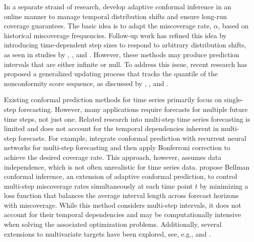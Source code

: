 \documentclass[
  11pt,
  a4paper,
]{article}
\theoremstyle{plain}
\theoremstyle{remark}
\begin{document}
In a separate strand of research, \textcite{gibbs2021} develop adaptive
conformal inference in an online manner to manage temporal distribution
shifts and ensure long-run coverage guarantees. The basic idea is to
adapt the miscoverage rate, \(\alpha\), based on historical miscoverage
frequencies. Follow-up work has refined this idea by introducing
time-dependent step sizes to respond to arbitrary distribution shifts,
as seen in studies by \textcite{bastani2022}, \textcite{zaffran2022},
and \textcite{gibbs2024}. However, these methods may produce prediction
intervals that are either infinite or null. To address this issue,
recent research has proposed a generalized updating process that tracks
the quantile of the nonconformity score sequence, as discussed by
\textcite{bhatnagar2023}, \textcite{angelopoulos2024}, and
\textcite{angelopoulos2024online}.

Existing conformal prediction methods for time series primarily focus on
single-step forecasting. However, many applications require forecasts
for multiple future time steps, not just one. Related research into
multi-step time series forecasting is limited and does not account for
the temporal dependencies inherent in multi-step forecasts. For example,
\textcite{stankeviciute2021} integrate conformal prediction with
recurrent neural networks for multi-step forecasting and then apply
Bonferroni correction to achieve the desired coverage rate. This
approach, however, assumes data independence, which is not often
unrealistic for time series data. \textcite{yang2024ts} propose Bellman
conformal inference, an extension of adaptive conformal prediction, to
control multi-step miscoverage rates simultaneously at each time point
\(t\) by minimizing a loss function that balances the average interval
length across forecast horizons with miscoverage. While this method
considers multi-step intervals, it does not account for their temporal
dependencies and may be computationally intensive when solving the
associated optimization problems. Additionally, several extensions to
multivariate targets have been explored, see, e.g.,
\textcite{schlembach2022} and \textcite{sun2022}.
\end{document}
